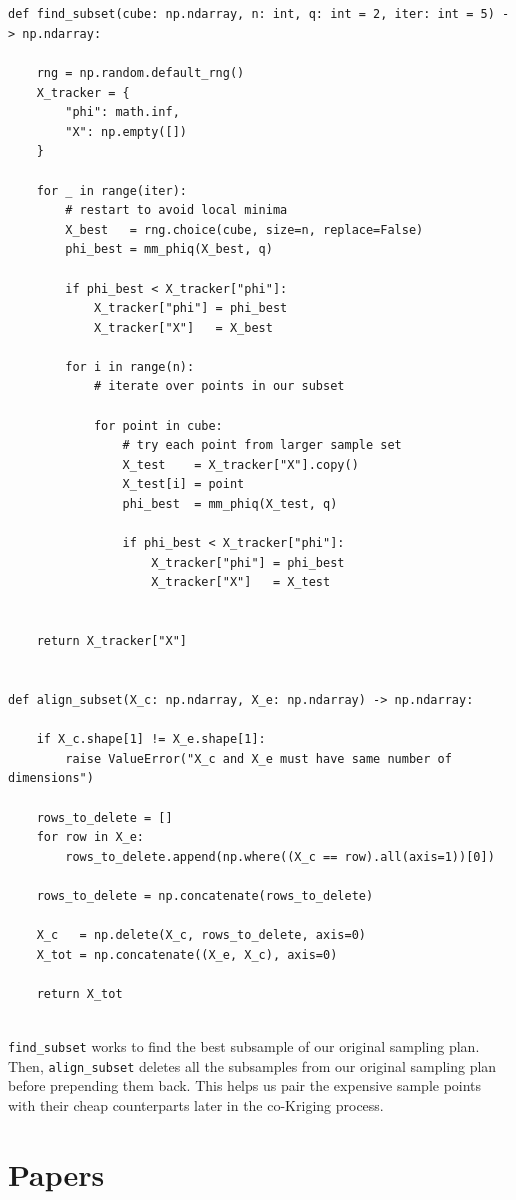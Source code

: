 \documentclass[11pt]{article}
\newcommand{\standing}[1]{\clearpage\section{#1}}
\theoremstyle{definition}
\begin{document}
\begin{lstlisting}


def find_subset(cube: np.ndarray, n: int, q: int = 2, iter: int = 5) -> np.ndarray:

    rng = np.random.default_rng()
    X_tracker = {
        "phi": math.inf,
        "X": np.empty([])
    }

    for _ in range(iter):
        # restart to avoid local minima
        X_best   = rng.choice(cube, size=n, replace=False)
        phi_best = mm_phiq(X_best, q)

        if phi_best < X_tracker["phi"]:
            X_tracker["phi"] = phi_best
            X_tracker["X"]   = X_best

        for i in range(n):
            # iterate over points in our subset
            
            for point in cube:
                # try each point from larger sample set
                X_test    = X_tracker["X"].copy()
                X_test[i] = point
                phi_best  = mm_phiq(X_test, q)

                if phi_best < X_tracker["phi"]:
                    X_tracker["phi"] = phi_best
                    X_tracker["X"]   = X_test

        
    return X_tracker["X"]


def align_subset(X_c: np.ndarray, X_e: np.ndarray) -> np.ndarray:

    if X_c.shape[1] != X_e.shape[1]:
        raise ValueError("X_c and X_e must have same number of dimensions")
    
    rows_to_delete = []
    for row in X_e:
        rows_to_delete.append(np.where((X_c == row).all(axis=1))[0])

    rows_to_delete = np.concatenate(rows_to_delete)
    
    X_c   = np.delete(X_c, rows_to_delete, axis=0)
    X_tot = np.concatenate((X_e, X_c), axis=0)

    return X_tot
    
\end{lstlisting}

 \texttt{find\_subset} works to find the best subsample of our original sampling plan. Then, \texttt{align\_subset} deletes all the
subsamples from our original sampling plan before prepending them back. This helps us pair the expensive
sample points with their cheap counterparts later in the co-Kriging process.

\standing{Papers}
\localtableofcontents
\end{document}
